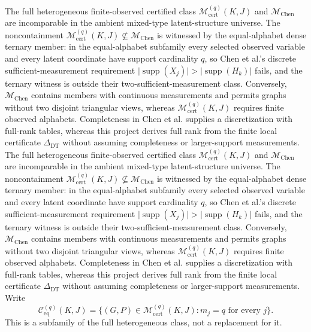 The full heterogeneous finite-observed certified class \(\mathcal M_{\mathrm{cert}}^{(q)}(K,J)\) and \(\mathcal M_{\mathrm{Chen}}\) are incomparable in the ambient mixed-type latent-structure universe.  The noncontainment \(\mathcal M_{\mathrm{cert}}^{(q)}(K,J)\not\subseteq\mathcal M_{\mathrm{Chen}}\) is witnessed by the equal-alphabet dense ternary member: in the equal-alphabet subfamily every selected observed variable and every latent coordinate have support cardinality \(q\), so Chen et al.'s discrete sufficient-measurement requirement \(\lvert\operatorname{supp}(X_j)\rvert>\lvert\operatorname{supp}(H_k)\rvert\) fails, and the ternary witness is outside their two-sufficient-measurement class.  Conversely, \(\mathcal M_{\mathrm{Chen}}\) contains members with continuous measurements and permits graphs without two disjoint triangular views, whereas \(\mathcal M_{\mathrm{cert}}^{(q)}(K,J)\) requires finite observed alphabets.  Completeness in Chen et al. supplies a discretization with full-rank tables, whereas this project derives full rank from the finite local certificate \(\Delta_{\mathrm{DT}}\) without assuming completeness or larger-support measurements.
The full heterogeneous finite-observed certified class \(\mathcal M_{\mathrm{cert}}^{(q)}(K,J)\) and \(\mathcal M_{\mathrm{Chen}}\) are incomparable in the ambient mixed-type latent-structure universe.  The noncontainment \(\mathcal M_{\mathrm{cert}}^{(q)}(K,J)\not\subseteq\mathcal M_{\mathrm{Chen}}\) is witnessed by the equal-alphabet dense ternary member: in the equal-alphabet subfamily every selected observed variable and every latent coordinate have support cardinality \(q\), so Chen et al.'s discrete sufficient-measurement requirement \(\lvert\operatorname{supp}(X_j)\rvert>\lvert\operatorname{supp}(H_k)\rvert\) fails, and the ternary witness is outside their two-sufficient-measurement class.  Conversely, \(\mathcal M_{\mathrm{Chen}}\) contains members with continuous measurements and permits graphs without two disjoint triangular views, whereas \(\mathcal M_{\mathrm{cert}}^{(q)}(K,J)\) requires finite observed alphabets.  Completeness in Chen et al. supplies a discretization with full-rank tables, whereas this project derives full rank from the finite local certificate \(\Delta_{\mathrm{DT}}\) without assuming completeness or larger-support measurements.
Write
\[
 \mathcal C_{\mathrm{eq}}^{(q)}(K,J)
 =\bigl\{(G,P)\in\mathcal M_{\mathrm{cert}}^{(q)}(K,J):m_j=q
   \text{ for every }j\bigr\}.
\]
This is a subfamily of the full heterogeneous class, not a replacement for it.

